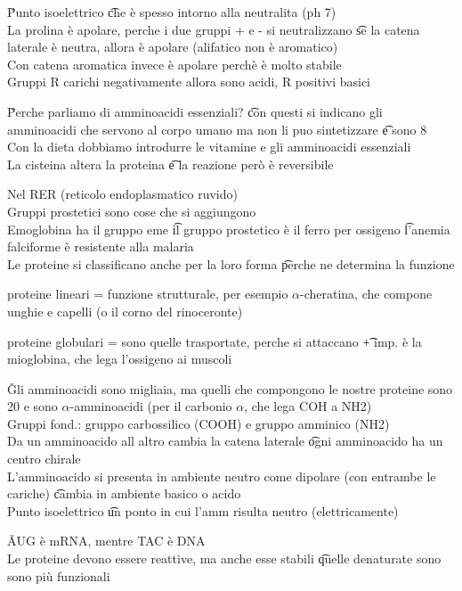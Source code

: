 \documentclass[12pt]{article}
\begin{document}
\v

Punto isoelettrico \t che è spesso intorno alla neutralita (ph 7) \\
La prolina è apolare, perche i due gruppi + e - si neutralizzano \t se la catena laterale è neutra, allora è apolare (alifatico non è aromatico) \\
Con catena aromatica invece è apolare perchè è molto stabile \\
Gruppi R carichi negativamente allora sono acidi, R positivi basici

\v

Perche parliamo di amminoacidi essenziali? \t con questi si indicano gli amminoacidi che servono al corpo umano ma non li puo sintetizzare \t e sono 8 \\
Con la dieta dobbiamo introdurre le vitamine e gli amminoacidi essenziali \\
La cisteina altera la proteina \t e la reazione però è reversibile

\s[Proteine]
Nel RER (reticolo endoplasmatico ruvido) \\
Gruppi prostetici sono cose che si aggiungono \\
Emoglobina ha il gruppo eme \t il gruppo prostetico è il ferro per ossigeno \t l'anemia falciforme è resistente alla malaria \\
Le proteine si classificano anche per la loro forma \t perche ne determina la funzione \\
\bi
    \item proteine lineari = funzione strutturale, per esempio $\alpha$-cheratina, che compone unghie e capelli (o il corno del rinoceronte) 
    \item proteine globulari = sono quelle trasportate, perche si attaccano \t + imp. è la mioglobina, che lega l'ossigeno ai muscoli
\ei

\v

Gli amminoacidi sono migliaia, ma quelli che compongono le nostre proteine sono 20 e sono $\alpha$-amminoacidi (per il carbonio $\alpha$, che lega COH a NH2) \\
Gruppi fond.: gruppo carbossilico (COOH) e gruppo amminico (NH2) \\
Da un amminoacido all altro cambia la catena laterale \t ogni amminoacido ha un centro chirale \\
L'amminoacido si presenta in ambiente neutro come dipolare (con entrambe le cariche) \t cambia in ambiente basico o acido \\
Punto isoelettrico \t un ponto in cui l'amm risulta neutro (elettricamente)

\v

AUG è mRNA, mentre TAC è DNA \\
Le proteine devono essere reattive, ma anche esse stabili \t quelle denaturate sono sono più funzionali
\end{document}

